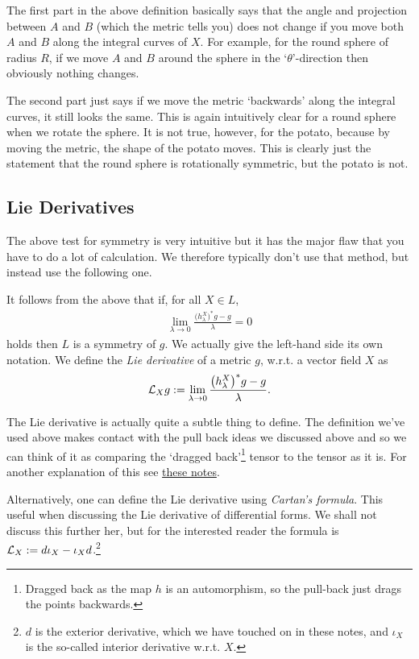 \documentclass[12pt]{article} %
\begin{document}
The first part in the above definition basically says that the angle and projection between $A$ and $B$ (which the metric tells you) does not change if you move both $A$ and $B$ along the integral curves of $X$. For example, for the round sphere of radius $R$, if we move $A$ and $B$ around the sphere in the `$\theta$'-direction then obviously nothing changes. 

The second part just says if we move the metric `backwards' along the integral curves, it still looks the same. This is again intuitively clear for a round sphere when we rotate the sphere. It is not true, however, for the potato, because by moving the metric, the shape of the potato moves. This is clearly just the statement that the round sphere is rotationally symmetric, but the potato is not. 

\subsection{Lie Derivatives}\label{sub:inbdarqr}

The above test for symmetry is very intuitive but it has the major flaw that you have to do a lot of calculation. We therefore typically don't use that method, but instead use the following one. 

It follows from the above that if, for all $X\in L$, 
\begin{align*} 
    \lim_{\lambda\to0}\frac{\big(h^X_{\lambda}\big)^*g-g}{\lambda} =0
\end{align*} 
holds then $L$ is a symmetry of $g$. We actually give the left-hand side its own notation. We define the \textit{Lie derivative} of a metric $g$, w.r.t. a vector field $X$ as 
\begin{align*} 
    \mathcal{L}_Xg := \lim_{\lambda\to0}\frac{\big(h^X_{\lambda}\big)^*g-g}{\lambda}.
\end{align*}

The Lie derivative is actually quite a subtle thing to define. The definition we've used above makes contact with the pull back ideas we discussed above and so we can think of it as comparing the `dragged back'\footnote{Dragged back as the map $h$ is an automorphism, so the pull-back just drags the points backwards.} tensor to the tensor as it is. For another explanation of this see \href{http://web.math.ucsb.edu/~ebrahim/liederivs_tame.pdf}{these notes}.

\br 
    Alternatively, one can define the Lie derivative using \textit{Cartan's formula}. This useful when discussing the Lie derivative of differential forms. We shall not discuss this further her, but for the interested reader the formula is $\mathcal{L}_X := d\iota_X - \iota_Xd$.\footnote{$d$ is the exterior derivative, which we have touched on in these notes, and $\iota_X$ is the so-called interior derivative w.r.t. $X$.}
\er
\end{document}
